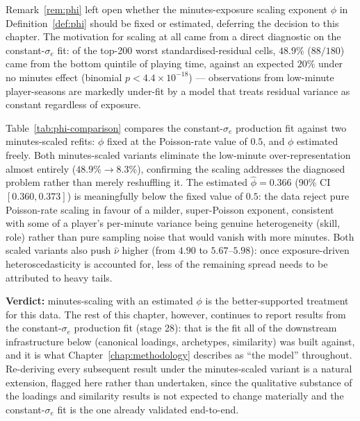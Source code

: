 Remark~\ref{rem:phi} left open whether the minutes-exposure scaling exponent $\phi$ in
Definition~\ref{def:phi} should be fixed or estimated, deferring the decision to this chapter. The motivation
for scaling at all came from a direct diagnostic on the constant-$\sigma_e$ fit: of the top-200 worst
standardised-residual cells, $48.9\%$ ($88/180$) came from the bottom quintile of playing time, against an
expected $20\%$ under no minutes effect (binomial $p < 4.4\times10^{-18}$) --- observations from low-minute
player-seasons are markedly under-fit by a model that treats residual variance as constant regardless of
exposure.

\begin{table}[h]
\centering
\caption{Resolving $\phi$: constant-$\sigma_e$ baseline vs.\ two minutes-scaled variants. "Low-minute
worst-cell share" repeats the diagnostic above, recomputed on each fit's own residuals.}
\label{tab:phi-comparison}

\end{table}

Table~\ref{tab:phi-comparison} compares the constant-$\sigma_e$ production fit against two minutes-scaled
refits: $\phi$ fixed at the Poisson-rate value of $0.5$, and $\phi$ estimated freely. Both minutes-scaled
variants eliminate the low-minute over-representation almost entirely ($48.9\% \to 8.3\%$), confirming the
scaling addresses the diagnosed problem rather than merely reshuffling it. The estimated $\hat\phi = 0.366$
(90\% CI $[0.360, 0.373]$) is meaningfully below the fixed value of $0.5$: the data reject pure Poisson-rate
scaling in favour of a milder, super-Poisson exponent, consistent with some of a player's per-minute variance
being genuine heterogeneity (skill, role) rather than pure sampling noise that would vanish with more minutes.
Both scaled variants also push $\hat\nu$ higher (from $4.90$ to $5.67$--$5.98$): once exposure-driven
heteroscedasticity is accounted for, less of the remaining spread needs to be attributed to heavy tails.

\textbf{Verdict:} minutes-scaling with an estimated $\phi$ is the better-supported treatment for this data.
The rest of this chapter, however, continues to report results from the constant-$\sigma_e$ production fit
(stage 28): that is the fit all of the downstream infrastructure below (canonical loadings, archetypes,
similarity) was built against, and it is what Chapter~\ref{chap:methodology} describes as ``the model''
throughout. Re-deriving every subsequent result under the minutes-scaled variant is a natural extension, flagged
here rather than undertaken, since the qualitative substance of the loadings and similarity results is not
expected to change materially and the constant-$\sigma_e$ fit is the one already validated end-to-end.

